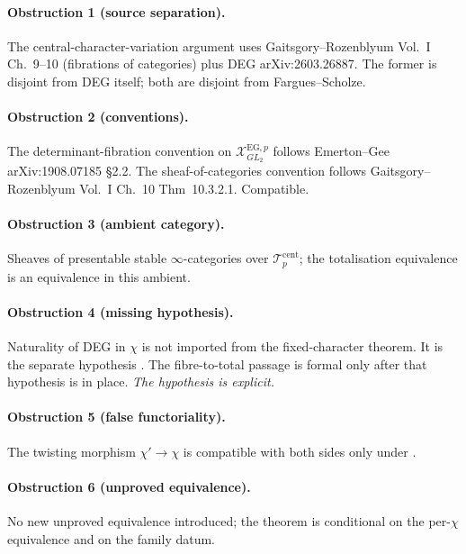 \paragraph{Obstruction 1 (source separation).} The central-character-variation
argument uses Gaitsgory--Rozenblyum Vol.~I Ch.~9--10 (fibrations
of categories) plus DEG arXiv:2603.26887. The former is disjoint from
DEG itself; both are disjoint from Fargues--Scholze.

\paragraph{Obstruction 2 (conventions).} The determinant-fibration
convention on \(\mathcal{X}^{\mathrm{EG},p}_{GL_{2}}\) follows
Emerton--Gee arXiv:1908.07185 \S 2.2. The sheaf-of-categories
convention follows Gaitsgory--Rozenblyum Vol.~I Ch.~10 Thm~10.3.2.1.
Compatible.

\paragraph{Obstruction 3 (ambient category).} Sheaves of presentable
stable \(\infty\)-categories over \(\mathcal{T}^{\mathrm{cent}}_{p}\);
the totalisation equivalence is an equivalence in this ambient.

\paragraph{Obstruction 4 (missing hypothesis).} Naturality of DEG in
\(\chi\) is not imported from the fixed-character theorem.  It is the
separate hypothesis
.  The
fibre-to-total passage is formal only after that hypothesis is in
place. \emph{The hypothesis is explicit.}

\paragraph{Obstruction 5 (false functoriality).} The twisting morphism
\(\chi'\to\chi\) is compatible with both sides only under
.

\paragraph{Obstruction 6 (unproved equivalence).} No new unproved
equivalence introduced; the theorem is conditional on the
per-\(\chi\) equivalence and on the family datum.

